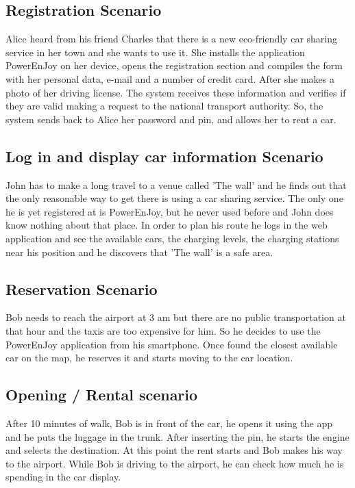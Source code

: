 \subsection {Registration Scenario}
Alice heard from his friend Charles that there is a new eco-friendly car sharing service in her town and she wants to use it. She installs the application PowerEnJoy on her device, opens the registration section and compiles the form with her personal data, e-mail and a number of credit card. After she makes a photo of her driving license. The system receives these information and verifies if they are valid making a request to the national transport authority. So, the system sends back to Alice her password and pin, and allows her to rent a car.

\subsection{Log in and display car information Scenario}
John has to make a long travel to a venue called 'The wall' and he finds out that the only reasonable way to get there is using a car sharing service. The only one he is yet registered at is PowerEnJoy, but he never used before and John does know nothing about that place. In order to plan his route he logs in the web application and see the available cars, the charging levels, the charging stations near his position and he discovers that 'The wall' is a safe area. 

\subsection{Reservation Scenario}
Bob needs to reach the airport at 3 am but there are no public transportation at that hour and the taxis are too expensive for him. So he decides to use the PowerEnJoy application from his smartphone. Once found the closest available car on the map, he reserves it and starts moving to the car location.

\subsection{Opening / Rental scenario}
After 10 minutes of walk, Bob is in front of the car, he opens it using the app and he puts the luggage in the trunk. After inserting the pin, he starts the engine and selects the destination. At this point the rent starts and Bob makes his way to the airport. While Bob is driving to the airport, he can check how much he is spending in the car display.


